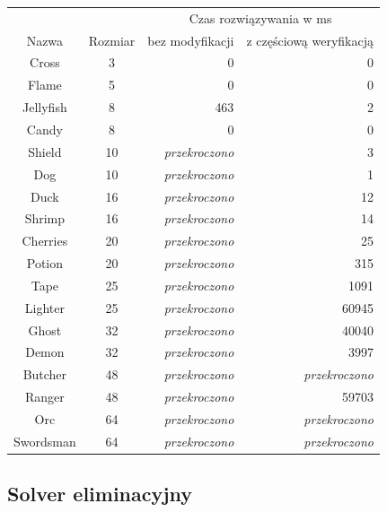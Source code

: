 \begin{center}
    \begin{tabular}{|c|c|r r|}
        \hline
        {}          & {}        & \multicolumn{2}{c|}{Czas rozwiązywania w ms} \\
        Nazwa       & Rozmiar   & bez modyfikacji & z częściową weryfikacją \\
        \hline
        Cross       & 3         & 0                     & 0 \\
        Flame       & 5         & 0                     & 0 \\
        Jellyfish   & 8         & 463                   & 2 \\
        Candy       & 8         & 0                     & 0 \\
        Shield      & 10        & \textit{przekroczono} & 3 \\
        Dog         & 10        & \textit{przekroczono} & 1 \\
        Duck        & 16        & \textit{przekroczono} & 12 \\
        Shrimp      & 16        & \textit{przekroczono} & 14 \\
        Cherries    & 20        & \textit{przekroczono} & 25 \\
        Potion      & 20        & \textit{przekroczono} & 315 \\
        Tape        & 25        & \textit{przekroczono} & 1091 \\
        Lighter     & 25        & \textit{przekroczono} & 60945 \\
        \hline
        Ghost       & 32        & \textit{przekroczono} & 40040 \\
        Demon       & 32        & \textit{przekroczono} & 3997 \\
        Butcher     & 48        & \textit{przekroczono} & \textit{przekroczono} \\
        Ranger      & 48        & \textit{przekroczono} & 59703 \\
        Orc         & 64        & \textit{przekroczono} & \textit{przekroczono} \\
        Swordsman   & 64        & \textit{przekroczono} & \textit{przekroczono} \\
        \hline
    \end{tabular}
\end{center}


\subsection{Solver eliminacyjny}


